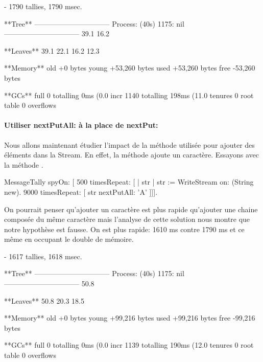 \documentclass[a4paper,10pt,twoside]{book}
\begin{document}
\begin{code}{}
 - 1790 tallies, 1790 msec.

**Tree**
--------------------------------
Process: (40s)  1175: nil
--------------------------------
39.1%
16.2%

**Leaves**
39.1%
22.1%
16.2%
12.3%

**Memory**
	old			+0 bytes
	young		+53,260 bytes
	used		+53,260 bytes
	free		-53,260 bytes

**GCs**
	full			0 totalling 0ms (0.0%
	incr		1140 totalling 198ms (11.0%
	tenures		0
	root table	0 overflows
\end{code}

\paragraph{Utiliser nextPutAll: \`a la place de nextPut:}
Nous allons maintenant \'etudier l'impact de la m\'ethode utilis\'ee
pour ajouter des \'el\'ements dans la Stream. En effet, la m\'ethode
 ajoute un caract\`ere. Essayons avec la m\'ethode
.

\begin{code}{}
MessageTally spyOn: 
    [ 500 timesRepeat: [
                    | str |  
                    str := WriteStream on: (String new). 
                    9000 timesRepeat: [ str nextPutAll: 'A' ]]].
\end{code}

On pourrait penser qu'ajouter un
caract\`ere est plus rapide qu'ajouter une chaine compos\'ee du m\^eme 
caract\`ere mais l'analyse de cette solution nous montre que notre
hypoth\`ese est fausse. On est plus rapide: 1610 ms contre 1790 ms
et ce m\^eme en occupant le double de m\'emoire. 

\begin{code}{}
 - 1617 tallies, 1618 msec.

**Tree**
--------------------------------
Process: (40s)  1175: nil
--------------------------------
50.8%

**Leaves**
50.8%
20.3%
18.5%

**Memory**
	old			+0 bytes
	young		+99,216 bytes
	used		+99,216 bytes
	free		-99,216 bytes

**GCs**
	full			0 totalling 0ms (0.0%
	incr		1139 totalling 190ms (12.0%
	tenures		0
	root table	0 overflows
\end{code}
\end{document}
